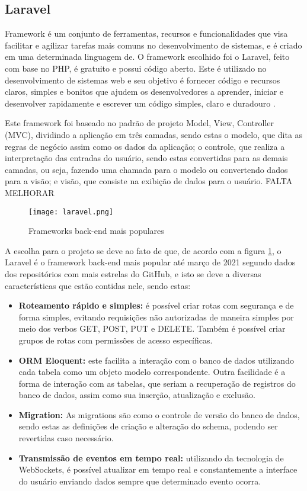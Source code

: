 \subsection{Laravel}
Framework é um conjunto de ferramentas, recursos e funcionalidades que visa facilitar e agilizar tarefas mais comuns no desenvolvimento de sistemas, e é criado em uma determinada linguagem de. O framework escolhido foi o Laravel, feito com base no PHP, é gratuito e possui código aberto. Este é utilizado no desenvolvimento de sistemas web e seu objetivo é fornecer código e recursos claros, simples e bonitos que ajudem os desenvolvedores a aprender, iniciar e desenvolver rapidamente e escrever um código simples, claro e duradouro \cite{STAUFFER}. 

Este framework foi baseado no padrão de projeto Model, View, Controller (MVC), dividindo a aplicação em três camadas, sendo estas o modelo, que dita as regras de negócio assim como os dados da aplicação; o controle, que realiza a interpretação das entradas do usuário, sendo estas convertidas para as demais camadas, ou seja, fazendo uma chamada para o modelo ou convertendo dados para a visão; e visão, que consiste na exibição de dados para o usuário. 
FALTA MELHORAR
\begin{figure}[h]
    \caption{\label{framework_popular}Frameworks back-end mais populares}
    \vspace{5pt}
    \centering
    \texttt{[image: laravel.png]}
    \vspace{5pt}
\end{figure}

A escolha para o projeto se deve ao fato de que, de acordo com a figura \ref{framework_popular}, o Laravel é o framework back-end mais popular até março de 2021 segundo dados dos repositórios com mais estrelas do GitHub, e isto se deve a diversas características que estão contidas nele, sendo estas:
\begin{itemize}
    \item \textbf{Roteamento rápido e simples:} é possível criar rotas com segurança e de forma simples, evitando requisições não autorizadas de maneira simples por meio dos verbos GET, POST, PUT e DELETE. Também é possível criar grupos de rotas com permissões de acesso específicas.
    \item \textbf{ORM Eloquent:} este facilita a interação com o banco de dados utilizando cada tabela como um objeto modelo correspondente. Outra facilidade é a forma de interação com as tabelas, que seriam a recuperação de registros do banco de dados, assim como sua inserção, atualização e exclusão.
    \item \textbf{Migration:} As migrations são como o controle de versão do banco de dados, sendo estas as definições de criação e alteração do schema, podendo ser revertidas caso necessário.
    \item \textbf{Transmissão de eventos em tempo real:} utilizando da tecnologia de WebSockets, é possível atualizar em tempo real e constantemente a interface do usuário enviando dados sempre que determinado evento ocorra.
\end{itemize}
